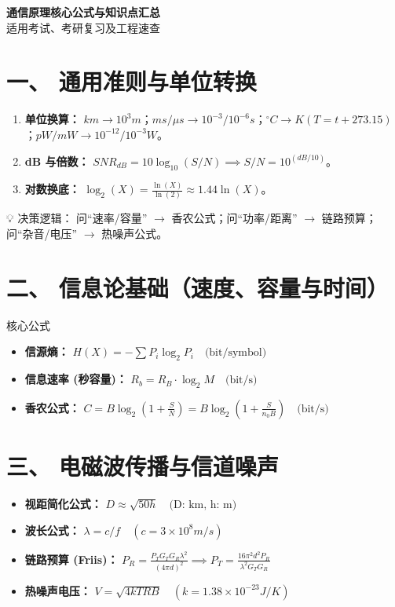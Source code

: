 \documentclass[11pt,a4paper]{ctexart} %
\begin{document}
\begin{center}
    {\huge \bfseries \color{MainBlue} 通信原理核心公式与知识点汇总} \\
    \vspace{0.3cm}
    {\small 适用考试、考研复习及工程速查}
\end{center}

\section{一、 通用准则与单位转换}
\begin{enumerate}
    \item \textbf{单位换算：} $km \to 10^3 m$；$ms/\mu s \to 10^{-3}/10^{-6} s$；$^\circ C \to K (T = t + 273.15)$；$pW/mW \to 10^{-12}/10^{-3} W$。
    \item \textbf{dB 与倍数：} $SNR_{dB} = 10 \log_{10}(S/N) \implies S/N = 10^{(dB/10)}$。
    \item \textbf{对数换底：} $\log_2(X) = \frac{\ln(X)}{\ln(2)} \approx 1.44 \ln(X)$。
\end{enumerate}

\begin{warningBox}
    💡 决策逻辑：
    问“速率/容量” $\to$ 香农公式；问“功率/距离” $\to$ 链路预算；问“杂音/电压” $\to$ 热噪声公式。
\end{warningBox}

\section{二、 信息论基础（速度、容量与时间）}
\begin{formulaBox}{核心公式}
    \begin{itemize}
        \item \textbf{信源熵：} $H(X) = -\sum P_i \log_2 P_i \quad \text{(bit/symbol)}$
        \item \textbf{信息速率 (秒容量)：} $R_b = R_B \cdot \log_2 M \quad \text{(bit/s)}$
        \item \textbf{香农公式：} $C = B \log_2 (1 + \frac{S}{N}) = B \log_2 (1 + \frac{S}{n_0 B}) \quad \text{(bit/s)}$
    \end{itemize}
\end{formulaBox}

\section{三、 电磁波传播与信道噪声}
\begin{itemize}
    \item \textbf{视距简化公式：} $D \approx \sqrt{50h} \quad \text{(D: km, h: m)}$
    \item \textbf{波长公式：} $\lambda = c/f \quad (c = 3 \times 10^8 m/s)$
    \item \textbf{链路预算 (Friis)：} $P_R = \frac{P_T G_T G_R \lambda^2}{(4\pi d)^2} \implies P_T = \frac{16\pi^2 d^2 P_R}{\lambda^2 G_T G_R}$
    \item \textbf{热噪声电压：} $V = \sqrt{4kTRB} \quad (k = 1.38 \times 10^{-23} J/K)$
\end{itemize}
\end{document}
